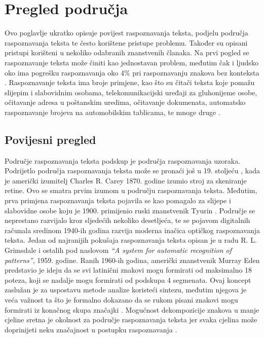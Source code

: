 \chapter{Pregled područja}
\label{ch:pregled-podrucja}
Ovo poglavlje ukratko opisuje povijest raspoznavanja teksta, podjelu područja raspoznavanja teksta te često korištene
pristupe problemu. Također su opisani pristupi korišteni u nekoliko odabranih znanstvenih članaka. Na prvi pogled se
raspoznavanje teksta može činiti kao jednostavan problem, međutim čak i ljudsko oko ima pogrešku raspoznavanja oko 4\%
pri raspoznavanju znakova bez konteksta \citep{mantas1986}. Raspoznavanje teksta ima broje primjene, kao što su čitači
teksta koje pomažu slijepim i slabovidnim osobama, telekomunikacijski uređaji za gluhonijeme osobe, očitavanje adresa u
poštanskim uredima, očitavanje dokumenata, automatsko raspoznavanje brojeva na automobilskim tablicama, te mnoge druge
\citep{govindan1989}.


\section{Povijesni pregled}
\label{sec:povijesni-pregled}
Područje raspoznavanja teksta podskup je područja raspoznavanja uzoraka. Podrijetlo područja raspoznavanja teksta može
se pronaći još u 19. stoljeću \citep{mantas1986}, kada je američki izumitelj Charles R. Carey 1870. godine izumio stroj
za skeniranje retine. Ovo se smatra prvim izumom u području raspoznavanja teksta. Međutim, prva primjena raspoznavanja
teksta pojavila se kao pomagalo za slijepe i slabovidne osobe koju je 1900. primijenio ruski znanstvenik Tyurin
\citep{govindan1989}. Područje se neprestano razvijalo kroz sljedećih nekoliko desetljeća, te se pojavom digitalnih
računala sredinom 1940-ih godina razvija moderna inačica optičkog raspoznavanja teksta. Jedan od najranijih pokušaja
raspoznavanja teksta opisan je u radu R. L. Grimsdale i ostalih pod naslovom
\emph{``A system for automatic recognition of patterns''}, 1959. godine. Ranih 1960-ih godina, američki znanstvenik
Murray Eden predstavio je ideju da se svi latinični znakovi mogu formirati od maksimalno 18 poteza, koji se nadalje mogu
formirati od podskupa 4 segmenata. Ovaj koncept zaslužan je za uspostavu metode analize koristeći sintezu, međutim
njegova je veća važnost ta što je formalno dokazano da se rukom pisani znakovi mogu formirati iz konačnog skupa
značajki \citep{mantas1986}. Mogućnost dekompozicije znakova u manje cjeline sretna je okolnost za područje
raspoznavanja teksta jer svaka cjelina može doprinijeti neku značajnost u postupku raspoznavanja \citep{mori1999}.


